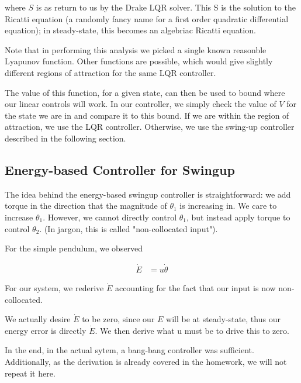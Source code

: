 \documentclass[conference]{IEEEtran}
\begin{document}
where $S$ is as return to us by the Drake LQR solver. This S is the solution to
the Ricatti equation (a randomly fancy name for a first order quadratic
differential equation); in steady-state, this becomes an algebriac Ricatti
equation.

Note that in performing this analysis we picked a single known
reasonble Lyapunov function. Other functions are possible, which would give
slightly different regions of attraction for the same LQR controller.


The value of this function, for a given state, can then be used to bound where
our linear controls will work. In our controller, we simply check the value of
$V$ for the state we are in and compare it to this bound. If we are within the
region of attraction, we use the LQR controller. Otherwise, we use the 
swing-up controller described in the following section.

\subsection{Energy-based Controller for Swingup}

The idea behind the energy-based swingup controller is straightforward: we add
torque in the direction that the magnitude of $\theta_1$ is increasing in. We
care to increase $\theta_1$. However, we cannot directly control $\theta_1$, but
instead apply torque to control $\theta_2$. (In jargon, this is called
"non-collocated input").

For the simple pendulum, we observed 

\begin{align}
    \dot E &= u \dot \theta
\end{align}

For our system, we rederive $\dot E$ accounting for the fact that our input is
now non-collocated.

We actually desire $\dot E$ to be zero, since our $E$ will be at steady-state,
thus our energy error is directly $\dot E$. We then derive what u must be to
drive this to zero.


In the end, in the actual sytem, a bang-bang controller was sufficient.
Additionally, as the derivation is already covered in the homework, we will not
repeat it here.
\end{document}

